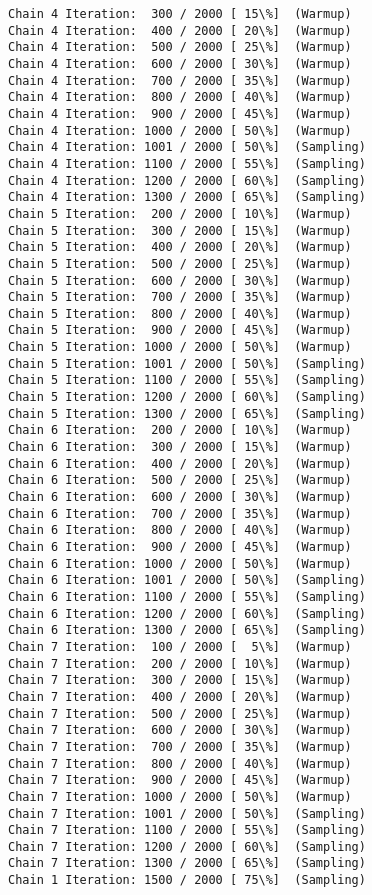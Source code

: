 \documentclass[11pt]{article}
\begin{document}
\begin{Verbatim}[commandchars=\\\{\}]
Chain 4 Iteration:  300 / 2000 [ 15\%]  (Warmup)
Chain 4 Iteration:  400 / 2000 [ 20\%]  (Warmup)
Chain 4 Iteration:  500 / 2000 [ 25\%]  (Warmup)
Chain 4 Iteration:  600 / 2000 [ 30\%]  (Warmup)
Chain 4 Iteration:  700 / 2000 [ 35\%]  (Warmup)
Chain 4 Iteration:  800 / 2000 [ 40\%]  (Warmup)
Chain 4 Iteration:  900 / 2000 [ 45\%]  (Warmup)
Chain 4 Iteration: 1000 / 2000 [ 50\%]  (Warmup)
Chain 4 Iteration: 1001 / 2000 [ 50\%]  (Sampling)
Chain 4 Iteration: 1100 / 2000 [ 55\%]  (Sampling)
Chain 4 Iteration: 1200 / 2000 [ 60\%]  (Sampling)
Chain 4 Iteration: 1300 / 2000 [ 65\%]  (Sampling)
Chain 5 Iteration:  200 / 2000 [ 10\%]  (Warmup)
Chain 5 Iteration:  300 / 2000 [ 15\%]  (Warmup)
Chain 5 Iteration:  400 / 2000 [ 20\%]  (Warmup)
Chain 5 Iteration:  500 / 2000 [ 25\%]  (Warmup)
Chain 5 Iteration:  600 / 2000 [ 30\%]  (Warmup)
Chain 5 Iteration:  700 / 2000 [ 35\%]  (Warmup)
Chain 5 Iteration:  800 / 2000 [ 40\%]  (Warmup)
Chain 5 Iteration:  900 / 2000 [ 45\%]  (Warmup)
Chain 5 Iteration: 1000 / 2000 [ 50\%]  (Warmup)
Chain 5 Iteration: 1001 / 2000 [ 50\%]  (Sampling)
Chain 5 Iteration: 1100 / 2000 [ 55\%]  (Sampling)
Chain 5 Iteration: 1200 / 2000 [ 60\%]  (Sampling)
Chain 5 Iteration: 1300 / 2000 [ 65\%]  (Sampling)
Chain 6 Iteration:  200 / 2000 [ 10\%]  (Warmup)
Chain 6 Iteration:  300 / 2000 [ 15\%]  (Warmup)
Chain 6 Iteration:  400 / 2000 [ 20\%]  (Warmup)
Chain 6 Iteration:  500 / 2000 [ 25\%]  (Warmup)
Chain 6 Iteration:  600 / 2000 [ 30\%]  (Warmup)
Chain 6 Iteration:  700 / 2000 [ 35\%]  (Warmup)
Chain 6 Iteration:  800 / 2000 [ 40\%]  (Warmup)
Chain 6 Iteration:  900 / 2000 [ 45\%]  (Warmup)
Chain 6 Iteration: 1000 / 2000 [ 50\%]  (Warmup)
Chain 6 Iteration: 1001 / 2000 [ 50\%]  (Sampling)
Chain 6 Iteration: 1100 / 2000 [ 55\%]  (Sampling)
Chain 6 Iteration: 1200 / 2000 [ 60\%]  (Sampling)
Chain 6 Iteration: 1300 / 2000 [ 65\%]  (Sampling)
Chain 7 Iteration:  100 / 2000 [  5\%]  (Warmup)
Chain 7 Iteration:  200 / 2000 [ 10\%]  (Warmup)
Chain 7 Iteration:  300 / 2000 [ 15\%]  (Warmup)
Chain 7 Iteration:  400 / 2000 [ 20\%]  (Warmup)
Chain 7 Iteration:  500 / 2000 [ 25\%]  (Warmup)
Chain 7 Iteration:  600 / 2000 [ 30\%]  (Warmup)
Chain 7 Iteration:  700 / 2000 [ 35\%]  (Warmup)
Chain 7 Iteration:  800 / 2000 [ 40\%]  (Warmup)
Chain 7 Iteration:  900 / 2000 [ 45\%]  (Warmup)
Chain 7 Iteration: 1000 / 2000 [ 50\%]  (Warmup)
Chain 7 Iteration: 1001 / 2000 [ 50\%]  (Sampling)
Chain 7 Iteration: 1100 / 2000 [ 55\%]  (Sampling)
Chain 7 Iteration: 1200 / 2000 [ 60\%]  (Sampling)
Chain 7 Iteration: 1300 / 2000 [ 65\%]  (Sampling)
Chain 1 Iteration: 1500 / 2000 [ 75\%]  (Sampling)

\end{Verbatim}
\end{document}
